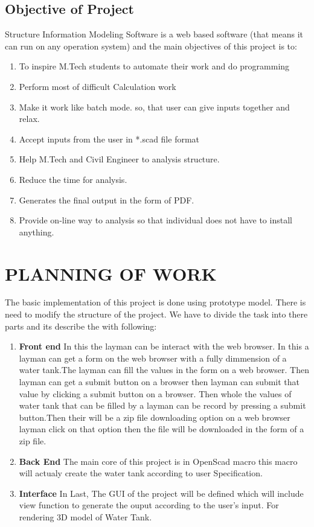 \documentclass[12pt,includeheadfoot,a4paper]{report}
\begin{document}
\section{Objective of Project}

Structure Information Modeling Software is a web based software (that means it can run on
any operation system) and the main objectives of this project is to:
\begin{enumerate}
\item  To inspire M.Tech students to automate their work and do programming
\item Perform most of difficult Calculation work
\item  Make it work like batch mode. so, that user can give inputs together and relax.
\item Accept inputs from the user in *.scad file format
\item Help M.Tech and Civil Engineer to analysis structure.
\item Reduce the time for analysis.
\item Generates the final output in the form of PDF.
\item Provide on-line way to analysis so that individual does not have to install anything.
	
\end{enumerate}

\chapter{PLANNING OF WORK}

The basic implementation of this project is done using prototype model. There is need to modify the structure of the project. We have to divide the task into there parts and its describe the with following:

\begin{enumerate}
	\item \textbf{Front end}
          In this the layman can be interact with the web browser. In this a layman can get a form on the web browser with a fully dimmension of a water tank.The layman can fill the values in the form on a web browser. Then layman can get a submit button on a browser then layman can submit that value by clicking a submit button on a browser. Then whole the values of water tank that can be filled by a layman can be record by pressing a submit button.Then their will be a zip file downloading option on a web browser layman click on that option then the file will be downloaded in the form of a zip file.
 
	\item \textbf{Back End}
	The main core of this project is in OpenScad macro this macro will actualy create the water tank according to user Specification. 
	
\item \textbf{Interface} In Last, The GUI of the project will be defined which will include view function to
generate the ouput according to the user’s input. For rendering 3D model of Water Tank.
\end{enumerate}
\end{document}
